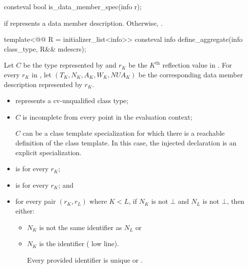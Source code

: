 %
\begin{itemdecl}
consteval bool is_data_member_spec(info r);
\end{itemdecl}

\begin{itemdescr}
\pnum
\returns
{} if  represents a data member description.
Otherwise, .
\end{itemdescr}

%
\begin{itemdecl}
template<@@ R = initializer_list<info>>
  consteval info define_aggregate(info class_type, R&& mdescrs);
\end{itemdecl}

\begin{itemdescr}
\pnum
Let $C$ be the type represented by 
and $r_K$ be the $K^\text{th}$ reflection value in .
For every $r_K$ in ,
let $(T_K, N_K, A_K, W_K, \mathit{NUA}_K)$ be
the corresponding data member description represented by $r_K$.

\pnum
\constantwhen
\begin{itemize}
\item
   represents a cv-unqualified class type;
\item
  $C$ is incomplete from every point in the evaluation context;
  \begin{note}
  $C$ can be a class template specialization
  for which there is a reachable definition of the class template.
  In this case,
  the injected declaration is an explicit specialization.
  \end{note}
\item
   is  for every $r_K$;
\item
   is  for every $r_K$; and
\item
  for every pair $(r_K, r_L)$ where $K < L$,
  if $N_K$ is not $\bot$ and $N_L$ is not $\bot$,
  then either:
  \begin{itemize}
  \item
    $N_K$ is not the same identifier as $N_L$ or
  \item
    $N_K$ is the identifier \tcode{_} ( low line).
    \begin{note}
    Every provided identifier is unique or .
    \end{note}
  \end{itemize}
\end{itemize}


\end{itemdescr}
